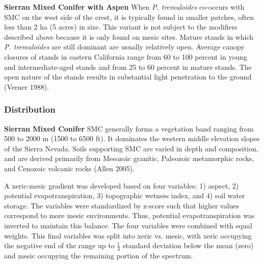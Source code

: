 \textbf{Sierran Mixed Conifer  with Aspen} When \emph{P. tremuloides} co-occurs with SMC on the west side of the crest, it is typically found in smaller patches, often less than 2 ha (5 acres) in size. This variant is not subject to the modifiers described above because it is only found on mesic sites. Mature stands in which \emph{P. tremuloides} are still dominant are usually relatively open. Average canopy closures of stands in eastern California range from 60 to 100 percent in young and intermediate-aged stands and from 25 to 60 percent in mature stands. The open nature of the stands results in substantial light penetration to the ground (Verner 1988).



\subsubsection{Distribution}

\textbf{Sierran Mixed Conifer } SMC generally forms a vegetation band ranging from 500 to 2000 m (1500 to 6500 ft). It dominates the western middle elevation slopes of the Sierra Nevada. Soils supporting SMC are varied in depth and composition, and are derived primarily from Mesozoic granitic, Paleozoic metamorphic rocks, and Cenozoic volcanic rocks (Allen 2005). 

A xeric-mesic gradient was developed based on four variables: 1) aspect, 2) potential evapotranspiration, 3) topographic wetness index, and 4) soil water storage. The variables were standardized by z-score such that higher values correspond to more mesic environments. Thus, potential evapotranspiration was inverted to maintain this balance. The four variables were combined with equal weights. This final variables was split into xeric vs. mesic, with xeric occupying the negative end of the range up to $\frac{1}{4}$ standard deviation below the mean (zero) and mesic occupying the remaining portion of the spectrum.


